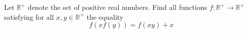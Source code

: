 Let $\mathbb{R}^{+}$ denote the set of positive real numbers. Find all functions $f : \mathbb{R}^{+} \to \mathbb{R}^{+}$ satisfying for all $x, y \in \mathbb{R}^{+}$ the equality
\[f(xf(y))=f(xy)+x\]